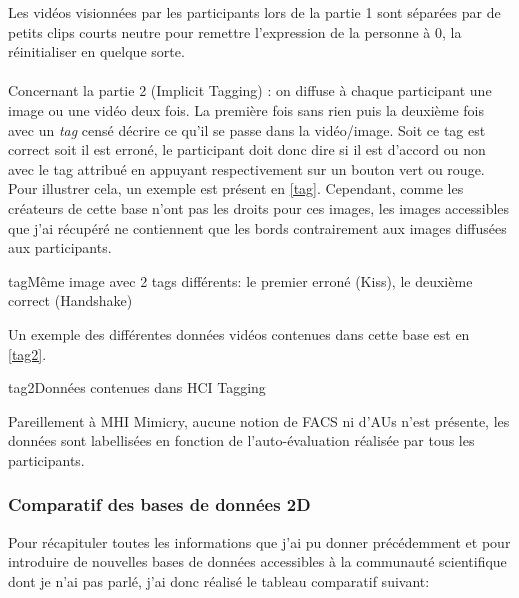 \documentclass[overfullbox, poster]{polytech/polytech}
\begin{document}
Les vidéos visionnées par les participants lors de la partie 1 sont séparées par de petits clips courts neutre pour remettre l'expression de la personne à 0, la réinitialiser en quelque sorte.\\
\\
Concernant la partie 2 (Implicit Tagging) : on diffuse à chaque participant une image ou une vidéo deux fois. La première fois sans rien puis la deuxième fois avec un \textit{tag} censé décrire ce qu'il se passe dans la vidéo/image. Soit ce tag est correct soit il est erroné, le participant doit donc dire si il est d'accord ou non avec le tag attribué en appuyant respectivement sur un bouton vert ou rouge. Pour illustrer cela, un exemple est présent en \autoref{tag}. Cependant, comme les créateurs de cette base n'ont pas les droits pour ces images, les images accessibles que j'ai récupéré ne contiennent que les bords contrairement aux images diffusées aux participants.\\

\begin{Figure}{tag}{Même image avec 2 tags différents: le premier erroné (Kiss), le deuxième correct (Handshake)}
\end{Figure}

Un exemple des différentes données vidéos contenues dans cette base est en \autoref{tag2}.

\begin{Figure}{tag2}{Données contenues dans HCI Tagging}
\end{Figure}

Pareillement à MHI Mimicry, aucune notion de FACS ni d'AUs n'est présente, les données sont labellisées en fonction de l'auto-évaluation réalisée par tous les participants.

\newpage
\subsubsection{Comparatif des bases de données 2D}
Pour récapituler toutes les informations que j'ai pu donner précédemment et pour introduire de nouvelles bases de données accessibles à la communauté scientifique dont je n'ai pas parlé, j'ai donc réalisé le tableau comparatif suivant:
\end{document}
